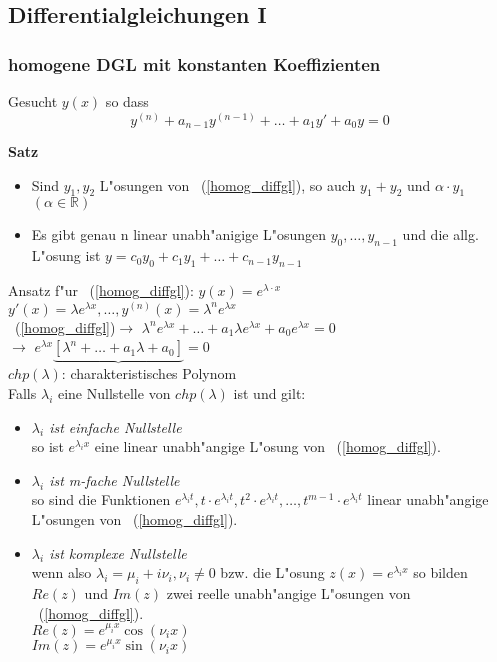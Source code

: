 \documentclass[german, 10pt, a4paper, twocolumn]{scrartcl}
\theoremstyle{definition}
\begin{document}
\subsection{Differentialgleichungen I}

\subsubsection{homogene DGL mit konstanten Koeffizienten}

Gesucht $y(x)$ so dass
\begin{equation}
 \label{homog_diffgl}
 y^{(n)}+a_{n-1}y^{(n-1)}+\ldots+a_1y'+a_0y=0
\end{equation}

\textbf{Satz}
\begin{itemize}
 \item Sind $y_1,y_2$ L"osungen von ~(\ref{homog_diffgl}), so auch $y_1+y_2$ und $\alpha\cdotp y_1$ $(\alpha \in \mathbb{R})$
 \item Es gibt genau n linear unabh"anigige L"osungen $y_0,\ldots ,y_{n-1}$ und die allg. L"osung ist $y=c_0y_0 + c_1y_1+\ldots+c_{n-1}y_{n-1}$
\end{itemize}

Ansatz f"ur ~(\ref{homog_diffgl}): $y(x)=e^{\lambda\cdotp x}$\\
$y'(x)=\lambda e^{\lambda x},\ldots , y^{(n)}(x)=\lambda^{n}e^{\lambda x}$\\
~(\ref{homog_diffgl})$\rightarrow$ $\lambda^n e^{\lambda x}+\ldots +a_1\lambda e^{\lambda x}+a_0 e^{\lambda x}=0$\\
$\rightarrow$ $e^{\lambda x}\underbrace{[\lambda^n +\ldots+a_1\lambda+a_0]}=0$\\
$chp(\lambda)$: charakteristisches Polynom\\

Falls $\lambda_i$ eine Nullstelle von $chp(\lambda)$ ist und gilt:
\begin{itemize}
 \item \textit{$\lambda_i$ ist einfache Nullstelle}\\
  so ist $e^{\lambda_i x}$ eine linear unabh"angige L"osung von ~(\ref{homog_diffgl}).
 \item \textit{$\lambda_i$ ist m-fache Nullstelle}\\
  so sind die Funktionen $e^{\lambda_i t},t\cdotp e^{\lambda_i t},t^2\cdotp e^{\lambda_i t},\ldots,t^{m-1}\cdotp e^{\lambda_i t}$ linear unabh"angige L"osungen von ~(\ref{homog_diffgl}).
 \item \textit{$\lambda_i$ ist komplexe Nullstelle}\\
  wenn also $\lambda_i=\mu_i + i\nu_i, \nu_i\neq 0$ bzw. die L"osung $z(x)=e^{\lambda_i x}$ so bilden $Re(z)$ und $Im(z)$ zwei reelle unabh"angige L"osungen von ~(\ref{homog_diffgl}).\\
  $Re(z)=e^{\mu_i x}\cos(\nu_i x)$\\
  $Im(z)=e^{\mu_i x}\sin(\nu_i x)$\\
\end{itemize}
\end{document}
